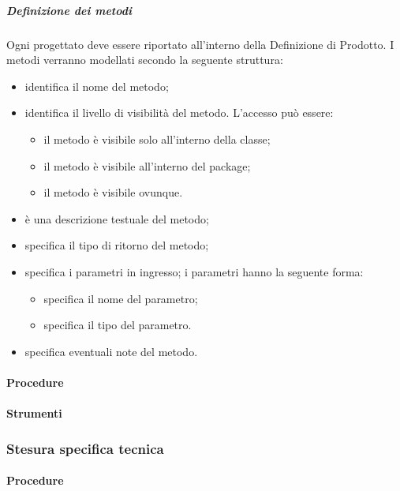 \subparagraph{Definizione dei metodi}
Ogni  progettato deve essere riportato all'interno della Definizione di Prodotto. I metodi verranno modellati secondo la seguente struttura:
\begin{itemize}
\item {}identifica il nome del metodo;
\item {}identifica il livello di visibilità del metodo. L'accesso può essere:
\begin{itemize}
\item {}il metodo è visibile solo all'interno della classe;
\item {}il metodo è visibile all'interno del package;
\item {}il metodo è visibile ovunque.
\end{itemize}
\item {}è una descrizione testuale del metodo;
\item {}specifica il tipo di ritorno del metodo;
\item {}specifica i parametri in ingresso; i parametri hanno la seguente forma:
\begin{itemize}
\item {}specifica il nome del parametro;
\item {}specifica il tipo del parametro.
\end{itemize}
\item {}specifica eventuali note del metodo.
\end{itemize}



\paragraph{Procedure}

\paragraph{Strumenti}


\subsubsection{Stesura specifica tecnica}

\paragraph{Procedure}

